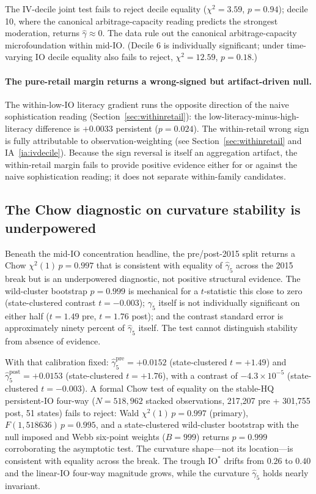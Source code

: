 The IV-decile joint test fails to reject decile equality ($\chi^{2} = 3.59$, $p = 0.94$); decile 10, where the canonical arbitrage-capacity reading predicts the strongest moderation, returns $\hat\gamma \approx 0$. The data rule out the canonical arbitrage-capacity microfoundation within mid-IO. (Decile 6 is individually significant; under time-varying IO decile equality also fails to reject, $\chi^{2} = 12.59$, $p = 0.18$.)

\paragraph{The pure-retail margin returns a wrong-signed but artifact-driven null.} The within-low-IO literacy gradient runs the opposite direction of the naive sophistication reading (Section~\ref{sec:withinretail}): the low-literacy-minus-high-literacy difference is $+0.0033$ persistent ($p = 0.024$). The within-retail wrong sign is fully attributable to observation-weighting (see Section~\ref{sec:withinretail} and IA~\ref{ia:ivdecile}). Because the sign reversal is itself an aggregation artifact, the within-retail margin fails to provide positive evidence either for or against the naive sophistication reading; it does not separate within-family candidates.

\subsection{The Chow diagnostic on curvature stability is underpowered}
\label{sec:mech-stability}

Beneath the mid-IO concentration headline, the pre/post-2015 split returns a Chow $\chi^{2}(1)\,p = 0.997$ that is consistent with equality of $\hat\gamma_{5}$ across the 2015 break but is an underpowered diagnostic, not positive structural evidence. The wild-cluster bootstrap $p = 0.999$ is mechanical for a $t$-statistic this close to zero (state-clustered contrast $t = -0.003$); $\gamma_{5}$ itself is not individually significant on either half ($t = 1.49$ pre, $t = 1.76$ post); and the contrast standard error is approximately ninety percent of $\hat\gamma_{5}$ itself. The test cannot distinguish stability from absence of evidence.

With that calibration fixed: $\hat\gamma_{5}^{\text{pre}} = +0.0152$ (state-clustered $t = +1.49$) and $\hat\gamma_{5}^{\text{post}} = +0.0153$ (state-clustered $t = +1.76$), with a contrast of $-4.3 \times 10^{-5}$ (state-clustered $t = -0.003$). A formal Chow test of equality on the stable-HQ persistent-IO four-way ($N = 518{,}962$ stacked observations, 217,207 pre + 301,755 post, 51 states) fails to reject: Wald $\chi^{2}(1)\,p = 0.997$ (primary), $F(1, 518636)\,p = 0.995$, and a state-clustered wild-cluster bootstrap with the null imposed and Webb six-point weights ($B = 999$) returns $p = 0.999$ corroborating the asymptotic test. The curvature shape---not its location---is consistent with equality across the break. The trough $\mathrm{IO}^{\ast}$ drifts from $0.26$ to $0.40$ and the linear-IO four-way magnitude grows, while the curvature $\hat\gamma_{5}$ holds nearly invariant.

